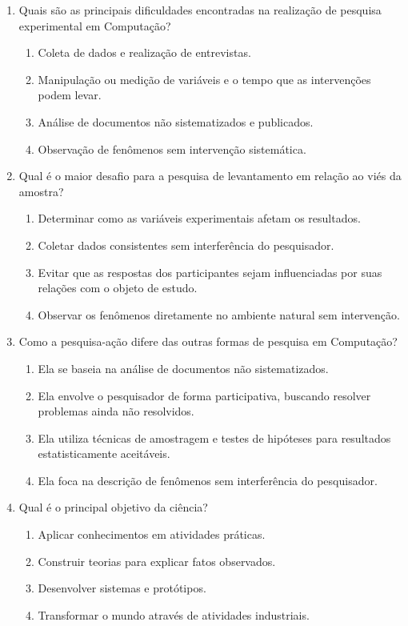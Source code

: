 \documentclass[a4paper,12pt]{article}
\begin{document}
\begin{enumerate}
\item Quais são as principais dificuldades encontradas na realização de pesquisa experimental em Computação?
    \begin{enumerate}[label=(\alph*)]
        \item Coleta de dados e realização de entrevistas.
        \item Manipulação ou medição de variáveis e o tempo que as intervenções podem levar.
        \item Análise de documentos não sistematizados e publicados.
        \item Observação de fenômenos sem intervenção sistemática.
    \end{enumerate}

\item Qual é o maior desafio para a pesquisa de levantamento em relação ao viés da amostra?
    \begin{enumerate}[label=(\alph*)]
        \item Determinar como as variáveis experimentais afetam os resultados.
        \item Coletar dados consistentes sem interferência do pesquisador.
        \item Evitar que as respostas dos participantes sejam influenciadas por suas relações com o objeto de estudo.
        \item Observar os fenômenos diretamente no ambiente natural sem intervenção.
    \end{enumerate}

\item Como a pesquisa-ação difere das outras formas de pesquisa em Computação?
    \begin{enumerate}[label=(\alph*)]
        \item Ela se baseia na análise de documentos não sistematizados.
        \item Ela envolve o pesquisador de forma participativa, buscando resolver problemas ainda não resolvidos.
        \item Ela utiliza técnicas de amostragem e testes de hipóteses para resultados estatisticamente aceitáveis.
        \item Ela foca na descrição de fenômenos sem interferência do pesquisador.
    \end{enumerate}

    \item Qual é o principal objetivo da ciência?
    \begin{enumerate}[label=(\alph*)]
        \item Aplicar conhecimentos em atividades práticas.
        \item Construir teorias para explicar fatos observados.
        \item Desenvolver sistemas e protótipos.
        \item Transformar o mundo através de atividades industriais.
    \end{enumerate}


\end{enumerate}
\end{document}
